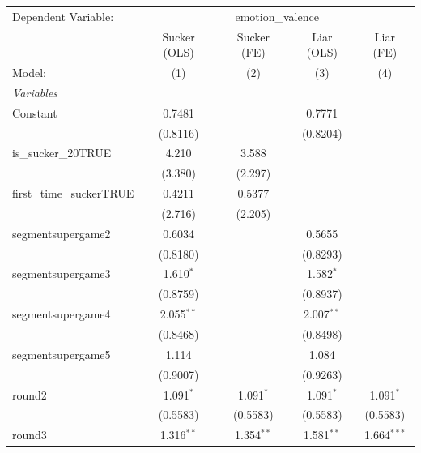 
\begingroup
\centering
\begin{tabular}{lcccc}
   \tabularnewline \midrule \midrule
   Dependent Variable: & \multicolumn{4}{c}{emotion\_valence}\\
                             & Sucker (OLS) & Sucker (FE)  & Liar (OLS)    & Liar (FE) \\   
   Model:                    & (1)          & (2)          & (3)           & (4)\\  
   \midrule
   \emph{Variables}\\
   Constant                  & 0.7481       &              & 0.7771        &   \\   
                             & (0.8116)     &              & (0.8204)      &   \\   
   is\_sucker\_20TRUE        & 4.210        & 3.588        &               &   \\   
                             & (3.380)      & (2.297)      &               &   \\   
   first\_time\_suckerTRUE   & 0.4211       & 0.5377       &               &   \\   
                             & (2.716)      & (2.205)      &               &   \\   
   segmentsupergame2         & 0.6034       &              & 0.5655        &   \\   
                             & (0.8180)     &              & (0.8293)      &   \\   
   segmentsupergame3         & 1.610$^{*}$  &              & 1.582$^{*}$   &   \\   
                             & (0.8759)     &              & (0.8937)      &   \\   
   segmentsupergame4         & 2.055$^{**}$ &              & 2.007$^{**}$  &   \\   
                             & (0.8468)     &              & (0.8498)      &   \\   
   segmentsupergame5         & 1.114        &              & 1.084         &   \\   
                             & (0.9007)     &              & (0.9263)      &   \\   
   round2                    & 1.091$^{*}$  & 1.091$^{*}$  & 1.091$^{*}$   & 1.091$^{*}$\\   
                             & (0.5583)     & (0.5583)     & (0.5583)      & (0.5583)\\   
   round3                    & 1.316$^{**}$ & 1.354$^{**}$ & 1.581$^{**}$  & 1.664$^{***}$\\   

\end{tabular}
